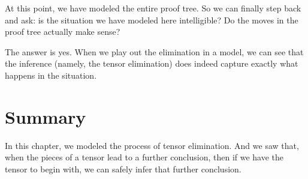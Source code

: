 \documentclass[../../../main.tex]{subfiles}
\begin{document}
\noindent
At this point, we have modeled the entire proof tree. So we can finally step back and ask: is the situation we have modeled here intelligible? Do the moves in the proof tree actually make sense?

The answer is yes. When we play out the elimination in a model, we can see that the inference (namely, the tensor elimination) does indeed capture exactly what happens in the situation.


\section{Summary}

In this chapter, we modeled the process of tensor elimination. And we saw that, when the pieces of a tensor lead to a further conclusion, then if we have the tensor to begin with, we can safely infer that further conclusion.
\end{document}
